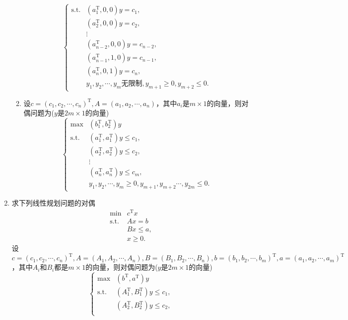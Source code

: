 \begin{enumerate}
\begin{enumerate}[label=(\arabic*)]
\[\begin{cases}
            \text{s.t.} & (a_1^{\mathrm{T}},0,0)y = c_1,\\
            & (a_2^{\mathrm{T}},0,0)y = c_2,\\
            & \vdots\\
            & (a_{n-2}^{\mathrm{T}},0,0)y = c_{n-2},\\
            & (a_{n-1}^{\mathrm{T}},1,0)y = c_{n-1},\\
            & (a_n^{\mathrm{T}},0,1)y = c_n,\\
            & y_1,y_2,\cdots,y_m \text{无限制}, y_{m+1} \geqslant 0, y_{m+2} \leqslant 0.
        \end{cases}\]
        \item 设$c=(c_1,c_2,\cdots,c_n)^{\mathrm{T}},A=(a_1,a_2,\cdots,a_n)$，其中$a_i$是$m \times 1$的向量，则对偶问题为($y$是$2m \times 1$的向量)
        \[\begin{cases}
            \max & (b_1^{\mathrm{T}},b_2^{\mathrm{T}})y\\
            \text{s.t.} & (a_1^{\mathrm{T}},a_1^{\mathrm{T}})y \leqslant c_1,\\
            & (a_2^{\mathrm{T}},a_2^{\mathrm{T}})y \leqslant c_2,\\
            & \vdots\\
            & (a_n^{\mathrm{T}},a_n^{\mathrm{T}})y \leqslant c_m,\\
            & y_1,y_2,\cdots,y_m \geqslant 0, y_{m+1},y_{m+2}\cdots,y_{2m} \leqslant 0.
        \end{cases}\]
    \end{enumerate}
    \item 求下列线性规划问题的对偶
    \[\begin{array}{ll}
        \min & c^{\mathrm{T}}x\\
        \text{s.t.} & Ax=b\\
        & Bx \leqslant a,\\
        & x \geqslant 0.
    \end{array}\]
    \sol 设$c=(c_1,c_2,\cdots,c_n)^{\mathrm{T}},A=(A_1,A_2,\cdots,A_n),B=(B_1,B_2,\cdots,B_n),b=(b_1,b_2,\cdots,b_m)^{\mathrm{T}},a=(a_1,a_2,\cdots,a_m)^{\mathrm{T}}$，其中$A_i$和$B_i$都是$m \times 1$的向量，则对偶问题为($y$是$2m \times 1$的向量)
    \[\begin{cases}
        \max & (b^{\mathrm{T}},a^{\mathrm{T}})y\\
        \text{s.t.} & (A_1^{\mathrm{T}},B_1^{\mathrm{T}})y \leqslant c_1,\\
        & (A_2^{\mathrm{T}},B_2^{\mathrm{T}})y \leqslant c_2,\\

\end{cases}\]
\end{enumerate}
